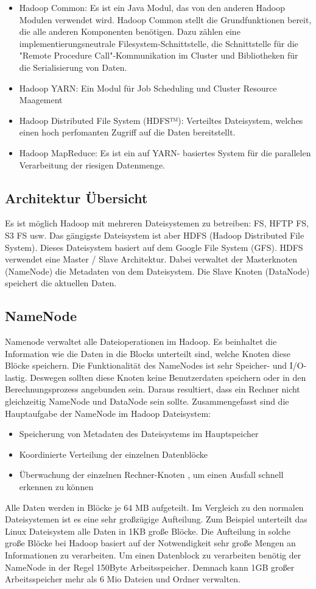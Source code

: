 \begin{itemize}
\item Hadoop Common: Es ist ein Java Modul, das von den anderen Hadoop Modulen verwendet wird. Hadoop Common stellt die Grundfunktionen bereit, die alle anderen Komponenten benötigen. Dazu zählen eine implementierungsneutrale Filesystem-Schnittstelle, die Schnittstelle für die "Remote Procedure Call"-Kommunikation im Cluster und Bibliotheken für die Serialisierung von Daten.
\item Hadoop YARN: Ein Modul für Job Scheduling und Cluster Resource Maagement
\item Hadoop Distributed File System (HDFS™): Verteiltes Dateisystem, welches einen hoch perfomanten Zugriff auf die Daten bereitstellt.
\item Hadoop MapReduce: Es ist ein auf YARN- basiertes System für die parallelen Verarbeitung der riesigen Datenmenge.
\end{itemize}
\subsection{Architektur Übersicht}
Es ist möglich Hadoop mit mehreren Dateisystemen zu betreiben: FS, HFTP FS, S3 FS usw. Das gängigste Dateisystem ist aber \ac{HDFS} (Hadoop Distributed File System). Dieses Dateisystem basiert auf dem Google File System (\ac{GFS}). 
HDFS verwendet eine Master / Slave Architektur. Dabei verwaltet der Masterknoten (NameNode) die Metadaten von dem Dateisystem. Die Slave Knoten (DataNode) speichert die aktuellen Daten.
\subsection{NameNode}
Namenode verwaltet alle Dateioperationen im Hadoop. Es beinhaltet die Information wie die Daten in die Blocks unterteilt sind, welche Knoten diese Blöcke speichern.
Die Funktionalität des NameNodes ist sehr Speicher- und I/O-lastig. Deswegen sollten diese Knoten keine Benutzerdaten speichern oder in den Berechnungsprozess angebunden sein. Daraus resultiert, dass ein Rechner nicht gleichzeitig NameNode und DataNode sein sollte.
Zusammengefasst sind die Hauptaufgabe der NameNode im Hadoop Dateisystem:
\begin{itemize}
\item Speicherung von Metadaten des Dateisystems im Hauptspeicher
\item Koordinierte Verteilung der einzelnen Datenblöcke
\item Überwachung der einzelnen Rechner-Knoten , um einen Ausfall schnell erkennen zu können 
\end{itemize}
\cite[S. XX]{Wartal2012}
Alle Daten werden in Blöcke je 64 MB aufgeteilt. Im Vergleich zu den normalen Dateisystemen ist es eine sehr großzügige Aufteilung. Zum Beispiel unterteilt das Linux Dateisystem alle Daten in 1KB große Blöcke. Die Aufteilung in solche große Blöcke bei Hadoop basiert auf der Notwendigkeit sehr große Mengen an Informationen zu verarbeiten. Um einen Datenblock zu verarbeiten benötig der NameNode in der Regel 150Byte Arbeitsspeicher. Demnach kann 1GB großer Arbeitsspeicher mehr als 6 Mio Dateien und Ordner verwalten. \cite[S. XX]{Wartal2012}
